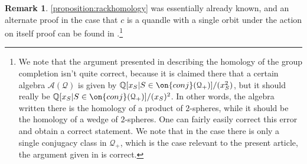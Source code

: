 \documentclass[12 pt]{amsart}
\theoremstyle{plain}
\theoremstyle{definition}
\newtheorem{remark}[theorem]{Remark}
\theoremstyle{remark}
\numberwithin{equation}{section}
\begin{document}
\begin{remark}
	\label{remark:}
	\autoref{proposition:rackhomology} was essentially already known, and an
	alternate proof in the case that $c$ is a quandle with a single orbit
	under the action on itself
	proof can be found in \cite[\S
	6.5]{bianchi:deloopings-of-hurwitz-spaces}.\footnote{We note that the argument presented in 
\cite[\S 6.5]{bianchi:deloopings-of-hurwitz-spaces}
describing the homology of the group completion isn't quite correct, because it
is claimed there that a certain algebra $\mathcal A(\mathcal Q)$ is given by
$\mathbb Q[x_S| S \in \on{conj}(\mathcal Q_+)]/(x^2_S)$, but it should really be
$\mathbb Q[x_S| S \in \on{conj}(\mathcal Q_+)]/(x_S)^2$. In other words,
the algebra written there is the homology of a product of $2$-spheres, while it
should be the homology of a wedge of $2$-spheres. One can fairly easily correct
this error and obtain a correct statement. We note that in the case there is
only a single conjugacy class in $\mathcal Q_+$, which is the case relevant to
the present article, the argument given in
\cite[\S 6.5]{bianchi:deloopings-of-hurwitz-spaces}
is correct.
}
	

\end{remark}
\end{document}
